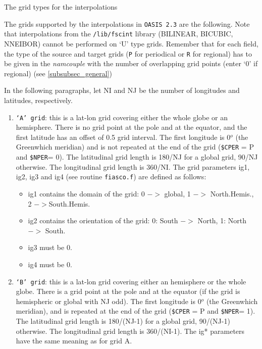 \newpage
\appendix
\begin{section}{The grid types for the interpolations}
\label{subsec_gridtypes}

The grids supported by the interpolations in {\tt OASIS 2.3} 
are the following. Note that interpolations
from the {\tt /lib/fscint} library (BILINEAR, BICUBIC, NNEIBOR) cannot
be performed on `U' type grids. Remember that for each field, the
type of the source and target grids ({\tt P} for periodical or
{\tt R} for regional) has to be given in the {\em namcouple}
with the number of overlapping grid points (enter `0' if regional)
(see \ref{subsubsec_general})

In the following paragraphs,
let NI and NJ be the number of longitudes and latitudes, respectively.

\begin{enumerate}
 
\item {\tt `A' grid}: this is a lat-lon grid covering either the whole
      globe or an hemisphere.
      There is no grid point at the pole and at the equator, and the
      first latitude has an offset of 0.5 grid interval. The first
      longitude is 0$^o$ (the Greenwhich meridian) and is not repeated
      at the end of the grid ({\tt \$CPER} = P and {\tt \$NPER}= 0). 
      The latitudinal 
      grid length is 180/NJ
      for a global grid, 90/NJ otherwise. The longitudinal grid length
      is 360/NI. The grid parameters ig1, ig2, ig3 and ig4 (see
      routine {\tt fiasco.f}) are defined as follows:
  \begin{itemize}
    \item ig1 contains the domain of the grid:
          0 $->$ global, 1 $->$ North.Hemis., 2 $-> $South.Hemis.
    \item ig2 contains the orientation of the grid:
          0: South $->$ North, 1: North $->$ South.
    \item ig3 must be 0.
    \item ig4 must be 0.
  \end{itemize}

\item {\tt `B' grid}: this is a lat-lon grid covering either an
      hemisphere or the whole globe. There is a grid point at the pole
      and at the equator (if the grid is hemispheric or global with NJ
      odd). The first longitude is 0$^o$ (the Greenwhich meridian), and
      is repeated at the end of the grid ({\tt \$CPER} = P and 
      {\tt \$NPER}= 1). 
      The latitudinal grid length
      is 180/(NJ-1) for a global grid, 90/(NJ-1) otherwise. The
      longitudinal grid length is 360/(NI-1). The ig* parameters
      have the same meaning as for grid A.


\end{enumerate}
\end{section}

